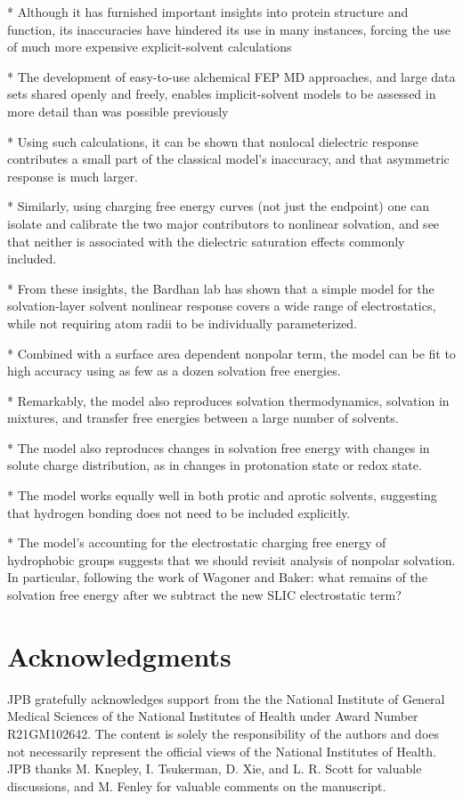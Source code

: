 \documentclass[reprint, letterpaper, nobibnotes, aps, superscriptaddress,prb]{revtex4-1}
\begin{document}
* Although it has furnished important insights into protein structure and function, its inaccuracies have hindered its use in many instances, forcing the use of much more expensive explicit-solvent calculations

* The development of easy-to-use alchemical FEP MD approaches, and large data sets shared openly and freely, enables implicit-solvent models to be assessed in more detail than was possible previously

* Using such calculations, it can be shown that nonlocal dielectric response contributes a small part of the classical model's inaccuracy, and that asymmetric response is much larger.

* Similarly, using charging free energy curves (not just the endpoint) one can isolate and calibrate the two major contributors to nonlinear solvation, and see that neither is associated with the dielectric saturation effects commonly included.

* From these insights, the Bardhan lab has shown that a simple model for the solvation-layer solvent nonlinear response covers a wide range of electrostatics, while not requiring atom radii to be individually parameterized.

* Combined with a surface area dependent nonpolar term, the model can be fit to high accuracy using as few as a dozen solvation free energies.  

* Remarkably, the model also reproduces solvation thermodynamics, solvation in mixtures, and transfer free energies between a large number of solvents.

* The model also reproduces changes in solvation free energy with changes in solute charge distribution, as in changes in protonation state or redox state.

* The model works equally well in both protic and aprotic solvents, suggesting that hydrogen bonding does not need to be included explicitly.

* The model's accounting for the electrostatic charging free energy of hydrophobic groups suggests that we should revisit analysis of nonpolar solvation.  In particular, following the work of Wagoner and Baker: what remains of the solvation free energy after we subtract the new SLIC electrostatic term?  

\section*{Acknowledgments}
JPB gratefully acknowledges support from the  the National Institute of General Medical Sciences of the National Institutes of Health under Award Number R21GM102642.  The content is solely the responsibility of the authors and does not necessarily represent the official views of the National Institutes of Health.  JPB thanks M. Knepley, I. Tsukerman, D. Xie, and L. R. Scott for valuable discussions, and M. Fenley for valuable comments on the manuscript.



\end{document}

